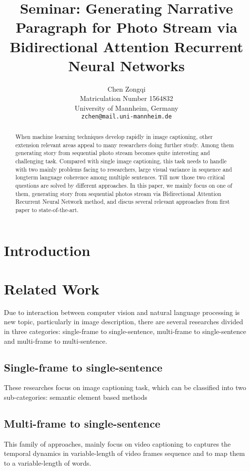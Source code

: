 \documentclass[11pt]{article}
\title{Seminar: Generating Narrative Paragraph for Photo Stream via Bidirectional Attention Recurrent Neural Networks}
\author{Chen Zongqi\\
	    Matriculation Number 1564832\\
	    University of Mannheim, Germany\\
	    {\tt zchen@mail.uni-mannheim.de}}
\date{}
\begin{document}
\maketitle

	\begin{abstract}
	When machine learning techniques develop rapidly in image captioning, other extension relevant areas appeal to many researchers doing further study. Among them generating story from sequential photo stream becomes quite interesting and challenging task. Compared with single image captioning, this task needs to handle with two mainly problems facing to researchers, large visual variance in sequence and longterm language coherence among multiple sentences. Till now those two critical questions are solved by different approaches. In this paper, we mainly focus on one of them, generating story from sequential photos stream via Bidirectional Attention Recurrent Neural Network method, and discus several relevant approaches from first paper to state-of-the-art.   
	\end{abstract}

	\section{Introduction}
	


	\section{Related Work}
	
	Due to interaction between computer vision and natural language processing is new topic, particularly in image description, there are several researches divided in three categories: single-frame to single-sentence, multi-frame to single-sentence and multi-frame to multi-sentence.		
		
		\subsection{ Single-frame to single-sentence}
		These researches focus on image captioning task, which can be classified into two sub-categories: semantic element based methods

		\subsection{Multi-frame to single-sentence}
		This family of approaches, mainly focus on video captioning to captures the temporal dynamics in variable-length of video frames sequence and to map them to a variable-length of words.		
		
\end{document}
